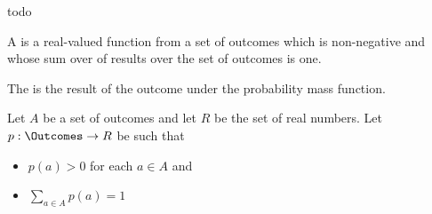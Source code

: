 

todo


A
is a real-valued function
from a set of outcomes which is
non-negative and whose sum over
of results over the set of outcomes
is one.

The 
is the result of the outcome
under the probability mass function.



Let $A$ be a set of outcomes and
let $R$ be the set of real numbers.
Let $p: \Outcomes \to R$ be such that

\begin{itemize}

\item $p(a) > 0$ for each $a \in A$ and
\item $\sum_{a \in A} p(a) = 1$

\end{itemize}
